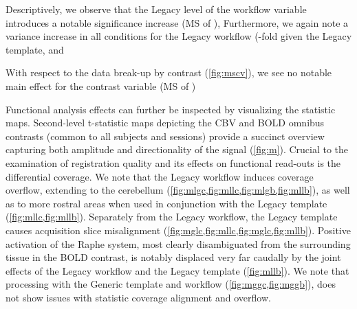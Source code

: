 Descriptively, we observe that the Legacy level of the workflow variable introduces a notable significance increase
(MS of ),
Furthermore, we again note a variance increase in all conditions for the Legacy workflow
(-fold
given the Legacy template, and

With respect to the data break-up by contrast (\cref{fig:mscv}), we see no notable main effect for the contrast variable
(MS of )

Functional analysis effects can further be inspected by visualizing the statistic maps.
Second-level t-statistic maps depicting the CBV and BOLD omnibus contrasts (common to all subjects and sessions) provide a succinct overview capturing both amplitude and directionality of the signal (\cref{fig:m}).
Crucial to the examination of registration quality and its effects on functional read-outs is the differential coverage.
We note that the Legacy workflow induces coverage overflow, extending to the cerebellum (\cref{fig:mlgc,fig:mllc,fig:mlgb,fig:mllb}), as well as to more rostral areas when used in conjunction with the Legacy template (\cref{fig:mllc,fig:mllb}).
Separately from the Legacy workflow, the Legacy template causes acquisition slice misalignment (\cref{fig:mglc,fig:mllc,fig:mglc,fig:mllb}).
Positive activation of the Raphe system, most clearly disambiguated from the surrounding tissue in the BOLD contrast, is notably displaced very far caudally by the joint effects of the Legacy workflow and the Legacy template (\cref{fig:mllb}).
We note that processing with the Generic template and workflow (\cref{fig:mggc,fig:mggb}), does not show issues with statistic coverage alignment and overflow.

